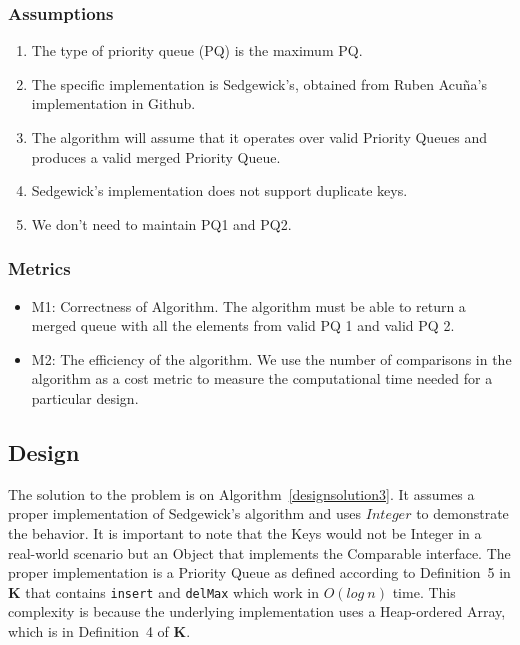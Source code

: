 \documentclass{article}
\begin{document}
\subsubsection{Assumptions}

\begin{enumerate}
  \item The type of priority queue (PQ) is the maximum PQ.
  \item The specific implementation is Sedgewick's, obtained from Ruben Acu\~na's implementation in Github.\cite{ser222:racuna1}
  \item The algorithm will assume that it operates over valid Priority Queues and produces a valid merged Priority Queue.
  \item Sedgewick's implementation does not support duplicate keys.
  \item We don't need to maintain PQ1 and PQ2.
\end{enumerate}

\subsubsection{Metrics}

\begin{itemize}
  \item M1: Correctness of Algorithm. The algorithm must be able to return a merged queue with all the elements from valid PQ 1 and valid PQ 2.
  \item M2: The efficiency of the algorithm. We use the number of comparisons in the algorithm as a cost metric to measure the computational time needed for a particular design.
\end{itemize}

\subsection{Design}

The solution to the problem is on Algorithm~\ref{designsolution3}. It assumes a proper implementation of Sedgewick's algorithm and uses $Integer$ to demonstrate the behavior. It is important to note that the Keys would not be Integer in a real-world scenario but an Object that implements the Comparable interface. 
The proper implementation is a Priority Queue as defined according to  Definition~5 in \textbf{K} that contains \verb|insert| and \verb|delMax| which work in $O(log~n)$ time. This complexity is because the underlying implementation uses a Heap-ordered Array, which is in Definition~4 of \textbf{K}. 
\end{document}
